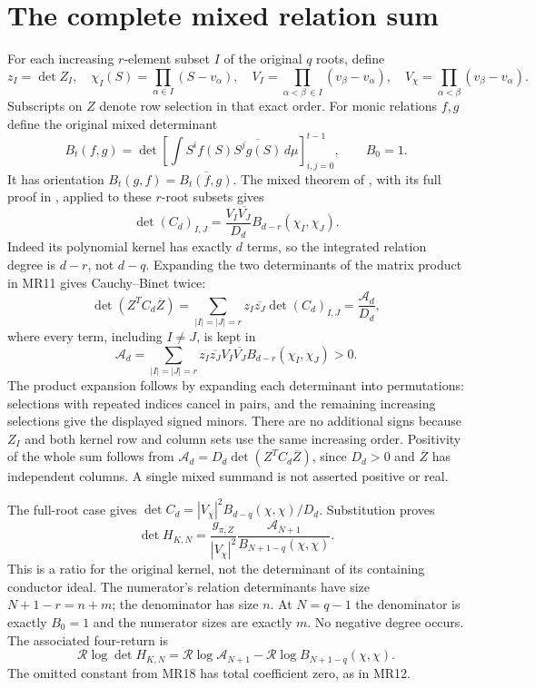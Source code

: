\documentclass[11pt]{article}
\begin{document}
\section{The complete mixed relation sum}
For each increasing $r$-element subset $I$ of the original $q$ roots,
define
\[
 z_I=\det Z_I,\quad
 \chi_I(S)=\prod_{\alpha\in I}(S-v_\alpha),\quad
 V_I=\prod_{\alpha<\beta\,\in I}(v_\beta-v_\alpha),\quad
 V_\chi=\prod_{\alpha<\beta}(v_\beta-v_\alpha).\tag{MR13}
\]
Subscripts on $Z$ denote row selection in that exact order.
For monic relations $f,g$ define the original mixed determinant
\[
 B_t(f,g)=\det\left[\int S^if(S)
                    \overline{S^jg(S)}\,d\mu\right]_{i,j=0}^{t-1},
 \qquad B_0=1.\tag{MR14}
\]
It has orientation $B_t(g,f)=\overline{B_t(f,g)}$.
The mixed theorem of \cite{mrroot:AV}, with its full proof in \cite{mrroot:Mixed},
applied to these $r$-root subsets gives
\[
 \det(C_d)_{I,J}
  =\frac{V_I\overline{V_J}}{D_d}
           B_{d-r}(\chi_I,\chi_J).\tag{MR15}
\]
Indeed its polynomial kernel has exactly $d$ terms, so the integrated
relation degree is $d-r$, not $d-q$. Expanding the two determinants
of the matrix product in MR11 gives Cauchy--Binet twice:
\[
 \det(Z^TC_d\overline Z)
  =\sum_{|I|=|J|=r}z_I\overline{z_J}\det(C_d)_{I,J}
  =\frac{\mathcal A_d}{D_d},\tag{MR16}
\]
where every term, including $I\ne J$, is kept in
\[
 \mathcal A_d=
 \sum_{|I|=|J|=r}z_I\overline{z_J}V_I\overline{V_J}
                     B_{d-r}(\chi_I,\chi_J)>0.\tag{MR17}
\]
The product expansion follows by expanding each determinant into
permutations: selections with repeated indices cancel in pairs, and
the remaining increasing selections give the displayed signed minors.
There are no additional signs because $Z_I$ and both kernel row and
column sets use the same increasing order.
Positivity of the whole sum follows from
$\mathcal A_d=D_d\det(Z^TC_d\overline Z)$, since $D_d>0$ and
$\overline Z$ has independent columns. A single mixed summand is not
asserted positive or real.

The full-root case gives
$\det C_d=|V_\chi|^2 B_{d-q}(\chi,\chi)/D_d$. Substitution proves
\[
 \boxed{\det H_{K,N}
   =\frac{g_{\pi,Z}}{|V_\chi|^2}
      \frac{\mathcal A_{N+1}}{B_{N+1-q}(\chi,\chi)}.}
 \tag{MR18}
\]
This is a ratio for the original kernel, not the determinant of its
containing conductor ideal. The numerator's relation determinants
have size $N+1-r=n+m$; the denominator has size $n$. At $N=q-1$ the
denominator is exactly $B_0=1$ and the numerator sizes are exactly $m$.
No negative degree occurs. The associated four-return is
\[
 \boxed{\mathcal R\log\det H_{K,N}
   =\mathcal R\log\mathcal A_{N+1}
      -\mathcal R\log B_{N+1-q}(\chi,\chi).}\tag{MR19}
\]
The omitted constant from MR18 has total coefficient zero, as in MR12.
\end{document}
